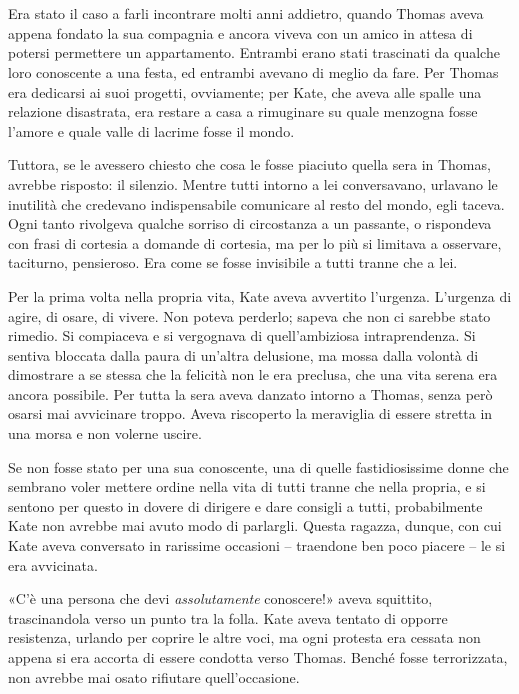 \chapter{}
\label{ch:2}

Era stato il caso a farli incontrare molti anni addietro, quando Thomas aveva appena fondato la sua
compagnia e ancora viveva con un amico in attesa di potersi permettere un appartamento. Entrambi
erano stati trascinati da qualche loro conoscente a una festa, ed entrambi avevano di meglio da
fare. Per Thomas era dedicarsi ai suoi progetti, ovviamente; per Kate, che aveva alle spalle una
relazione disastrata, era restare a casa a rimuginare su quale menzogna fosse l'amore e quale valle
di lacrime fosse il mondo.

Tuttora, se le avessero chiesto che cosa le fosse piaciuto quella sera in Thomas, avrebbe risposto:
il silenzio. Mentre tutti intorno a lei conversavano, urlavano le inutilità che credevano
indispensabile comunicare al resto del mondo, egli taceva. Ogni tanto rivolgeva qualche sorriso di
circostanza a un passante, o rispondeva con frasi di cortesia a domande di cortesia, ma per lo più
si limitava a osservare, taciturno, pensieroso. Era come se fosse invisibile a tutti tranne che a
lei.

Per la prima volta nella propria vita, Kate aveva avvertito l'urgenza. L'urgenza di agire, di osare,
di vivere. Non poteva perderlo; sapeva che non ci sarebbe stato rimedio. Si compiaceva e si
vergognava di quell'ambiziosa intraprendenza. Si sentiva bloccata dalla paura di un'altra delusione,
ma mossa dalla volontà di dimostrare a se stessa che la felicità non le era preclusa, che una vita
serena era ancora possibile. Per tutta la sera aveva danzato intorno a Thomas, senza però osarsi mai
avvicinare troppo. Aveva riscoperto la meraviglia di essere stretta in una morsa e non volerne
uscire.

Se non fosse stato per una sua conoscente, una di quelle fastidiosissime donne che sembrano voler
mettere ordine nella vita di tutti tranne che nella propria, e si sentono per questo in dovere di
dirigere e dare consigli a tutti, probabilmente Kate non avrebbe mai avuto modo di parlargli. Questa
ragazza, dunque, con cui Kate aveva conversato in rarissime occasioni -- traendone ben poco piacere
-- le si era avvicinata.

«C'è una persona che devi \emph{assolutamente} conoscere!» aveva squittito, trascinandola verso un
punto tra la folla. Kate aveva tentato di opporre resistenza, urlando per coprire le altre voci, ma
ogni protesta era cessata non appena si era accorta di essere condotta verso Thomas. Benché fosse
terrorizzata, non avrebbe mai osato rifiutare quell'occasione.

